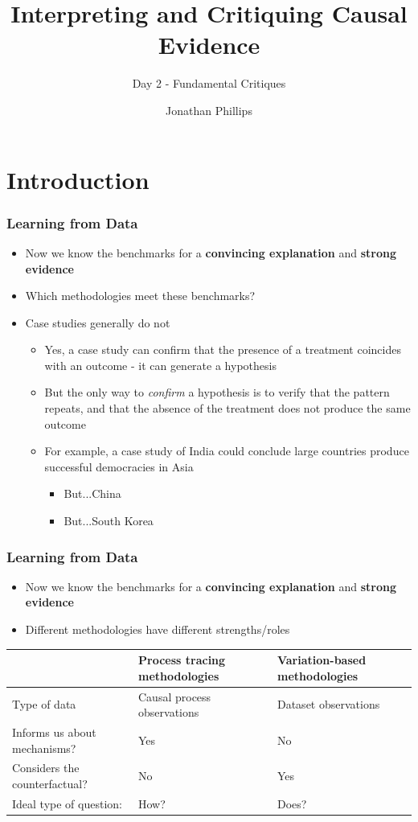 \documentclass[xcolor=x11names,compress]{beamer}\usepackage[]{graphicx}\usepackage[]{xcolor}
\title{Interpreting and Critiquing Causal Evidence}
\subtitle{Day 2 - Fundamental Critiques}
\author{Jonathan Phillips}
\renewcommand{\(}{\begin{columns}}
\renewcommand{\)}{\end{columns}}
\newcommand{\<}[1]{\begin{column}{#1}}
\renewcommand{\>}{\end{column}}
\begin{document}
\frame{\titlepage}

\section{Introduction}

\begin{frame}
\frametitle{Learning from Data}
\begin{itemize}
\item Now we know the benchmarks for a \textbf{convincing explanation} and \textbf{strong evidence}
\pause
\item Which methodologies meet these benchmarks?
\pause
\item Case studies generally do not
\pause
\begin{itemize}
\item Yes, a case study can confirm that the presence of a treatment coincides with an outcome - it can generate a hypothesis
\pause
\item But the only way to \textit{confirm} a hypothesis is to verify that the pattern repeats, and that the absence of the treatment does not produce the same outcome
\pause
\item For example, a case study of India could conclude large countries produce successful democracies in Asia
\pause
\begin{itemize}
\item But...China
\item But...South Korea
\end{itemize}
\end{itemize}
\end{itemize}
\end{frame}

\begin{frame}
\frametitle{Learning from Data}
\begin{itemize}
\item Now we know the benchmarks for a \textbf{convincing explanation} and \textbf{strong evidence}
\item Different methodologies have different strengths/roles
\pause
\end{itemize}
\begin{table}[]
\begin{tabular}{|p{4cm}|p{3cm}|p{3cm}|}
\hline
                              & Process tracing methodologies & Variation-based methodologies \\ \hline
Type of data                  & Causal process observations   & Dataset observations          \\ \hline
Informs us about mechanisms?  & Yes                           & No                            \\ \hline
Considers the counterfactual? & No                           & Yes                            \\ \hline
Ideal type of question:             & How?                          & Does?                         \\ \hline
\end{tabular}
\end{table}
\end{frame}
\end{document}
